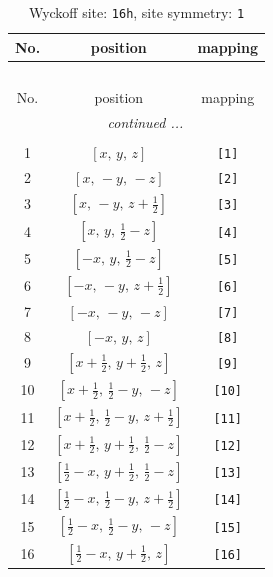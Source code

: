 \documentclass[fleqn,8pt]{jsarticle}
\begin{document}
\begin{longtable}{ccc}
\caption{Wyckoff site: {\tt 16h}, site symmetry: {\tt 1}}
 \\
 \hline \hline
No. & position & mapping \\ \hline \endfirsthead

\multicolumn{2}{l}{\tablename\ \thetable{}} \\
 \hline \hline
No. & position & mapping \\ \hline \endhead

 \hline \hline
\multicolumn{2}{r}{\footnotesize\it continued ...} \\ \endfoot

 \hline \hline
\multicolumn{2}{r}{} \\ \endlastfoot

1 & $\left[ x,\, y,\, z \right]$ & {\tt [1]} \\ \hline
2 & $\left[ x,\, - y,\, - z \right]$ & {\tt [2]} \\ \hline
3 & $\left[ x,\, - y,\, z + \frac{1}{2} \right]$ & {\tt [3]} \\ \hline
4 & $\left[ x,\, y,\, \frac{1}{2} - z \right]$ & {\tt [4]} \\ \hline
5 & $\left[ - x,\, y,\, \frac{1}{2} - z \right]$ & {\tt [5]} \\ \hline
6 & $\left[ - x,\, - y,\, z + \frac{1}{2} \right]$ & {\tt [6]} \\ \hline
7 & $\left[ - x,\, - y,\, - z \right]$ & {\tt [7]} \\ \hline
8 & $\left[ - x,\, y,\, z \right]$ & {\tt [8]} \\ \hline
9 & $\left[ x + \frac{1}{2},\, y + \frac{1}{2},\, z \right]$ & {\tt [9]} \\ \hline
10 & $\left[ x + \frac{1}{2},\, \frac{1}{2} - y,\, - z \right]$ & {\tt [10]} \\ \hline
11 & $\left[ x + \frac{1}{2},\, \frac{1}{2} - y,\, z + \frac{1}{2} \right]$ & {\tt [11]} \\ \hline
12 & $\left[ x + \frac{1}{2},\, y + \frac{1}{2},\, \frac{1}{2} - z \right]$ & {\tt [12]} \\ \hline
13 & $\left[ \frac{1}{2} - x,\, y + \frac{1}{2},\, \frac{1}{2} - z \right]$ & {\tt [13]} \\ \hline
14 & $\left[ \frac{1}{2} - x,\, \frac{1}{2} - y,\, z + \frac{1}{2} \right]$ & {\tt [14]} \\ \hline
15 & $\left[ \frac{1}{2} - x,\, \frac{1}{2} - y,\, - z \right]$ & {\tt [15]} \\ \hline
16 & $\left[ \frac{1}{2} - x,\, y + \frac{1}{2},\, z \right]$ & {\tt [16]} \\
\end{longtable}
\end{document}
